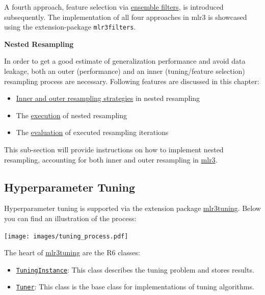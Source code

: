 \documentclass[]{article}
\providecommand{\tightlist}{%
  \setlength{\itemsep}{0pt}\setlength{\parskip}{0pt}}
\begin{document}
A fourth approach, feature selection via \protect\hyperlink{fs-ensemble}{ensemble filters}, is introduced subsequently.
The implementation of all four approaches in mlr3 is showcased using the extension-package \texttt{mlr3filters}.

\textbf{Nested Resampling}

In order to get a good estimate of generalization performance and avoid data leakage, both an outer (performance) and an inner (tuning/feature selection) resampling process are necessary.
Following features are discussed in this chapter:

\begin{itemize}
\tightlist
\item
  \protect\hyperlink{nested-resampling}{Inner and outer resampling strategies} in nested resampling
\item
  The \protect\hyperlink{nested-resamp-exec}{execution} of nested resampling
\item
  The \protect\hyperlink{nested-resamp-eval}{evaluation} of executed resampling iterations
\end{itemize}

This sub-section will provide instructions on how to implement nested resampling, accounting for both inner and outer resampling in \href{https://mlr3.mlr-org.com}{mlr3}.

\hypertarget{tuning}{%
\subsection{Hyperparameter Tuning}\label{tuning}}

Hyperparameter tuning is supported via the extension package \href{https://mlr3tuning.mlr-org.com}{mlr3tuning}.
Below you can find an illustration of the process:

\texttt{[image: images/tuning\_process.pdf]}

The heart of \href{https://mlr3tuning.mlr-org.com}{mlr3tuning} are the R6 classes:

\begin{itemize}
\tightlist
\item
  \href{https://mlr3tuning.mlr-org.com/reference/TuningInstance.html}{\texttt{TuningInstance}}: This class describes the tuning problem and stores results.
\item
  \href{https://mlr3tuning.mlr-org.com/reference/Tuner.html}{\texttt{Tuner}}: This class is the base class for implementations of tuning algorithms.
\end{itemize}
\end{document}
